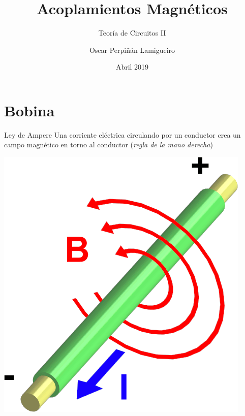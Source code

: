 \documentclass[xcolor={usenames,svgnames,dvipsnames}]{beamer}
\author{Oscar Perpiñán Lamigueiro}
\date{Abril 2019}
\title{Acoplamientos Magnéticos}
\subtitle{Teoría de Circuitos II}
\begin{document}
\maketitle

\section{Bobina}
\label{sec:org1fdc5e0}

\begin{frame}[label={sec:orge4ab99d}]{Ley de Ampere}
Una corriente eléctrica circulando por un conductor crea un campo magnético en torno al conductor (\emph{regla de la mano derecha})

\begin{center}
\includegraphics[height=0.7\textheight]{../figs/Electromagnetism.png}
\end{center}
\end{frame}
\end{document}
